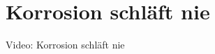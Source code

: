 \section{Korrosion schläft nie}
\BlueSectionSlide


\begin{frame}{Video: Korrosion schläft nie}


\end{frame}